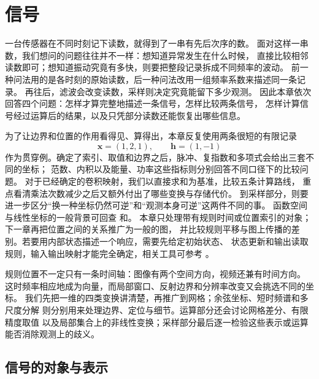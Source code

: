 \chapter{信号}
\label{chap:signal-analysis}

一台传感器在不同时刻记下读数，就得到了一串有先后次序的数。
面对这样一串数，我们想问的问题往往并不一样：想知道异常发生在什么时候，
直接比较相邻读数即可；想知道振动究竟有多快，则要把整段记录拆成不同频率的波动。
前一种问法用的是各时刻的原始读数，后一种问法改用一组频率系数来描述同一条记录。
再往后，滤波会改变读数，采样则决定究竟能留下多少观测。
因此本章依次回答四个问题：怎样才算完整地描述一条信号，怎样比较两条信号，
怎样计算信号经过运算后的结果，以及只凭部分读数还能恢复出哪些信息。

为了让边界和位置的作用看得见、算得出，本章反复使用两条很短的有限记录
\begin{equation}
  \bm x=(1,2,1),\qquad \bm h=(1,-1)
  \label{eq:signal-analysis-running-example}
\end{equation}
作为贯穿例。确定了索引、取值和边界之后，脉冲、复指数和多项式会给出三套不同的坐标；
范数、内积以及能量、功率这些指标则分别回答不同口径下的比较问题。
对于已经确定的卷积映射，我们以直接求和为基准，比较五条计算路线，
重点看清乘法次数减少之后又额外付出了哪些变换与存储代价。
到采样部分，则要进一步区分“换一种坐标仍然可逆”和“观测本身可逆”这两件不同的事。
函数空间与线性坐标的一般背景可回查
和。
本章只处理带有规则时间或位置索引的对象；下一章再把位置之间的关系推广为一般的图，
并比较规则平移与图上传播的差别。若要用内部状态描述一个响应，需要先给定初始状态、
状态更新和输出读取规则，输入输出映射才能完全确定，相关工具可参考
。

规则位置不一定只有一条时间轴：图像有两个空间方向，视频还兼有时间方向。
这时频率相应地成为向量，而局部窗口、反射边界和分辨率改变又会挑选不同的坐标。
我们先把一维的四类变换讲清楚，再推广到网格；余弦坐标、短时频谱和多尺度分解
则分别用来处理边界、定位与细节。运算部分还会讨论网格差分、有限精度取值
以及局部集合上的非线性变换；采样部分最后逐一检验这些表示或运算能否消除观测上的歧义。

\section{信号的对象与表示}
\label{sec:signal-objects-structure}

